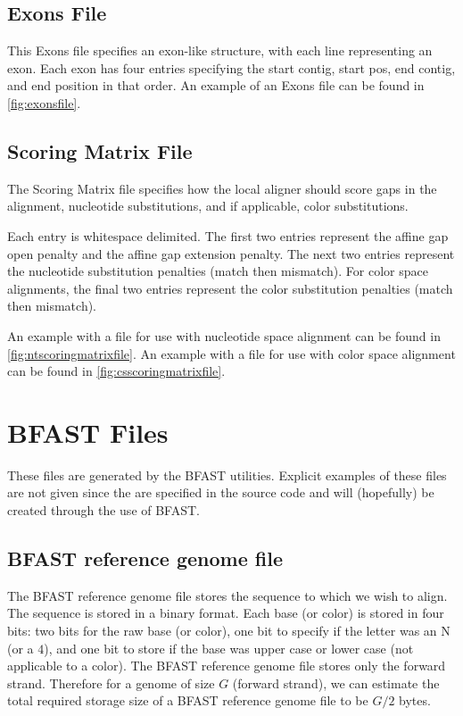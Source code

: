 \documentclass[a4paper,12pt]{book}
\newcommand{\BRGF}{BFAST reference genome file} %
\begin{document}
\subsection{Exons File}
\label{sec:exonsfile}
This Exons file specifies an exon-like structure, with each line representing an exon.
Each exon has four entries specifying the start contig, start pos, end contig, and end position in that order.
An example of an Exons file can be found in \autoref{fig:exonsfile}.
\subsection{Scoring Matrix File}
\label{sec:scoringmatrixfile}
The Scoring Matrix file specifies how the local aligner should score gaps in the alignment, nucleotide substitutions, and if applicable, color substitutions.

Each entry is whitespace delimited.
The first two entries represent the affine gap open penalty and the affine gap extension penalty.
The next two entries represent the nucleotide substitution penalties (match then mismatch).
For color space alignments, the final two entries represent the color substitution penalties (match then mismatch).

An example with a file for use with nucleotide space alignment can be found in \autoref{fig:ntscoringmatrixfile}.
An example with a file for use with color space alignment can be found in \autoref{fig:csscoringmatrixfile}.

\section{BFAST Files}
These files are generated by the BFAST utilities. 
Explicit examples of these files are not given since the are specified in the source code and will (hopefully) be created through the use of BFAST.
\label{sec:bfastfiles}
\subsection{\BRGF{}}
\label{sec:brgf}
The \BRGF{} stores the sequence to which we wish to align.
The sequence is stored in a binary format.
Each base (or color) is stored in four bits: two bits for the raw base (or color), one bit to specify if the letter was an N (or a $4$), and one bit to store if the base was upper case or lower case (not applicable to a color).
The \BRGF{} stores only the forward strand.
Therefore for a genome of size $G$ (forward strand), we can estimate the total required storage size of a \BRGF{} to be $G/2$ bytes.
\end{document}
